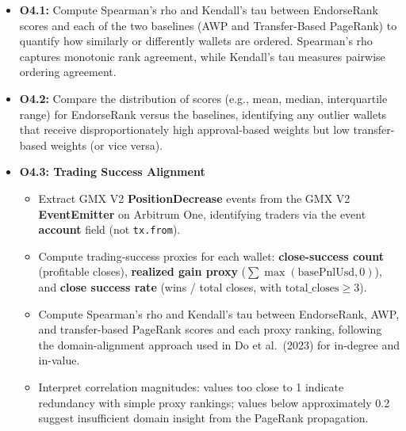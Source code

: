 \begin{itemize}
\item[\textbullet] \textbf{O4.1: }Compute\textbf{ }Spearman's rho and Kendall's tau between EndorseRank scores and each of the two baselines (AWP and Transfer-Based PageRank) to quantify how similarly or differently wallets are ordered. Spearman's rho captures monotonic rank agreement, while Kendall's tau measures pairwise ordering agreement.
\item[\textbullet] \textbf{O4.2:}\textbf{ }Compare the distribution of scores (e.g., mean, median, interquartile range) for EndorseRank versus the baselines, identifying any outlier wallets that receive disproportionately high approval-based weights but low transfer-based weights (or vice versa).
\item[\textbullet] \textbf{O4.3: Trading Success Alignment}
\begin{itemize}
\item[\textendash] Extract GMX V2 \textbf{PositionDecrease} events from the GMX V2 \textbf{EventEmitter} on Arbitrum One, identifying traders via the event \textbf{account} field (not \texttt{tx.from}).
\item[\textendash] Compute trading-success proxies for each wallet: \textbf{close-success count} (profitable closes), \textbf{realized gain proxy} ($\sum \max(\text{basePnlUsd}, 0)$), and \textbf{close success rate} (wins / total closes, with $\text{total\_closes} \geq 3$).
\item[\textendash] Compute Spearman's rho and Kendall's tau between EndorseRank, AWP, and transfer-based PageRank scores and each proxy ranking, following the domain-alignment approach used in Do et al.\ (2023) for in-degree and in-value.
\item[\textendash] Interpret correlation magnitudes: values too close to 1 indicate redundancy with simple proxy rankings; values below approximately 0.2 suggest insufficient domain insight from the PageRank propagation.
\end{itemize}
\end{itemize}

